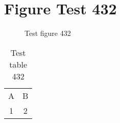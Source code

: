 \documentclass{article}
\begin{document}
\section{Figure Test 432}
\begin{figure}[h]
\caption{Test figure 432}
\end{figure}
\begin{table}[h]
\caption{Test table 432}
\begin{tabular}{cc}
A & B \\
1 & 2
\end{tabular}
\end{table}
\end{document}
